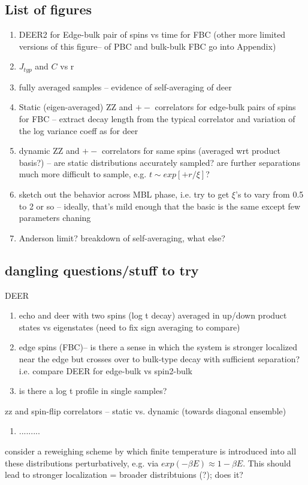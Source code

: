 \documentclass[aps,prb,twocolumn,showpacs,superscriptaddress,citeautoscript]{revtex4}  %
\begin{document}
\subsection{List of figures}
\begin{enumerate}
	\item DEER2 for Edge-bulk pair of spins vs time for FBC (other more limited versions of this figure-- of PBC and bulk-bulk FBC go into Appendix)
	\item $J_{typ}$ and $C$ vs r
	\item fully averaged samples -- evidence of self-averaging of deer
	\item Static (eigen-averaged) ZZ and $+-$ correlators for edge-bulk pairs of spins for FBC -- extract decay length from the typical correlator and variation of the log variance coeff as for deer
	\item dynamic ZZ and $+-$ correlators for same spins (averaged wrt product basis?) -- are static distributions accurately sampled? are further separations much more difficult to sample, e.g.  $t\sim exp[+r/\xi]$?
	\item sketch out the behavior across MBL phase, i.e. try to get $\xi$'s to vary from 0.5 to 2 or so -- ideally, that's mild enough that the basic is the same except few parameters chaning
	\item Anderson limit?  breakdown of self-averaging, what else?
\end{enumerate}
\subsection{dangling questions/stuff to try}
DEER
\begin{enumerate}
\item
echo and deer with two spins (log t decay) averaged in up/down product states vs eigenstates (need to fix sign averaging to compare)
\item edge spins (FBC)-- is there a sense in which the system is stronger localized near the edge but crosses over to bulk-type decay with sufficient separation? i.e. compare DEER for edge-bulk vs spin2-bulk
\item is there a log t profile in single samples?
\end{enumerate}

zz and spin-flip correlators -- static vs. dynamic (towards diagonal ensemble)
\begin{enumerate}
\item .........
\end{enumerate}

consider a reweighing scheme by which finite temperature is introduced into all these distributions perturbatively, e.g. via $exp(-\beta E)\approx 1-\beta E$.  This should lead to stronger localization = broader distribtuions (?); does it? 




\end{document}
